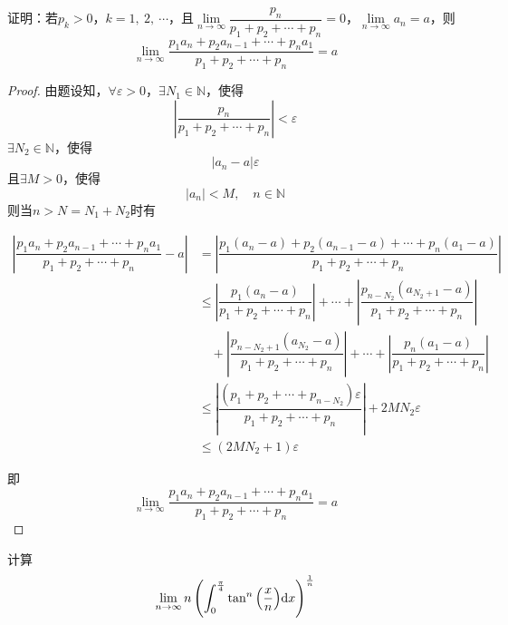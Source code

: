 \begin{proposition}
    
    证明：若$p_k > 0$，$k = 1,\ 2,\ \cdots$，且$\lim\limits_{n\to \infty}{\dfrac{p_n}{p_1 + p_2 + \cdots + p_n}} = 0$，$\lim\limits_{n \to \infty}{a_n} = a$，则
    $$\lim\limits_{n \to \infty}{\dfrac{p_1 a_n + p_2 a_{n - 1} + \cdots + p_n a_1}{p_1 + p_2 + \cdots + p_n}} = a$$

\end{proposition}

\begin{proof}

    由题设知，$\forall \varepsilon > 0$，$\exists N_1 \in \mathbb{N}$，使得
    $$\left| \dfrac{p_n}{p_1 + p_2 + \cdots + p_n} \right| < \varepsilon$$
    $\exists N_2 \in \mathbb{N}$，使得
    $$|a_n - a| \varepsilon$$
    且$\exists M > 0$，使得
    $$|a_n| < M, \quad n \in \mathbb{N}$$
    则当$n > N = N_1 + N_2$时有

    \begin{align*}
        \left| \dfrac{p_1 a_n + p_2 a_{n - 1} + \cdots + p_n a_1}{p_1 + p_2 + \cdots + p_n} - a \right| & = \left| \dfrac{p_1 (a_n - a) + p_2 (a_{n - 1} - a) + \cdots + p_n (a_1 - a)}{p_1 + p_2 + \cdots + p_n} \right| \\
        & \leq \left| \dfrac{p_1 (a_n - a)}{p_1 + p_2 + \cdots + p_n} \right| + \cdots + \left| \dfrac{p_{n - N_2} (a_{N_2 + 1} - a)}{p_1 + p_2 + \cdots + p_n} \right| \\
        & \quad + \left| \dfrac{p_{n - N_2 + 1} (a_{N_2} - a)}{p_1 + p_2 + \cdots + p_n} \right| + \cdots + \left| \dfrac{p_n (a_1 - a)}{p_1 + p_2 + \cdots + p_n} \right| \\
        & \leq \left| \dfrac{(p_1 + p_2 + \cdots + p_{n - N_2})\varepsilon}{p_1 + p_2 + \cdots + p_n} \right| + 2M N_2 \varepsilon \\
        & \leq (2M N_2 + 1) \varepsilon
    \end{align*}

    即
    $$\lim\limits_{n \to \infty}{\dfrac{p_1 a_n + p_2 a_{n - 1} + \cdots + p_n a_1}{p_1 + p_2 + \cdots + p_n}} = a$$
    
\end{proof}

\begin{proposition}

    计算
    $$\lim\limits_{n \to \infty}{n \left( \int_{0}^{\frac{\pi}{4}}{\tan^n{\left( \dfrac{x}{n} \right)}}\mathrm{d} x \right)^{\frac{1}{n}}}$$

\end{proposition}

